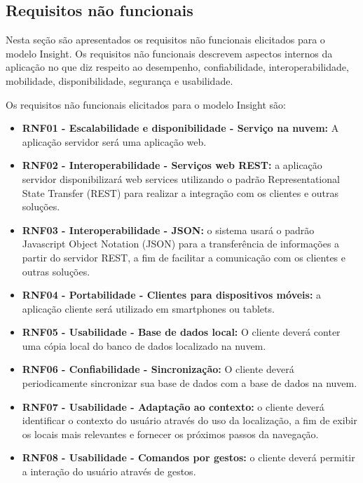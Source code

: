 \documentclass[english,brazilian]{UNISINOSmonografia}
\begin{document}
\subsection{Requisitos não funcionais}
Nesta seção são apresentados os requisitos não funcionais elicitados para o modelo Insight. Os requisitos não funcionais descrevem aspectos internos da aplicação no que diz respeito ao desempenho, confiabilidade, interoperabilidade, mobilidade, disponibilidade, segurança e usabilidade.

Os requisitos não funcionais elicitados para o modelo Insight são:

\begin{itemize}
	\item \textbf{RNF01 - Escalabilidade e disponibilidade - Serviço na nuvem:} A aplicação servidor será uma aplicação web.

	\item \textbf{RNF02 - Interoperabilidade - Serviços web REST:} a aplicação servidor disponibilizará web services utilizando o padrão Representational State Transfer (REST) para realizar a integração com os clientes e outras soluções.

	\item \textbf{RNF03 - Interoperabilidade - JSON:} o sistema usará o padrão Javascript Object Notation (JSON) para a transferência de informações a partir do servidor REST, a fim de facilitar a comunicação com os clientes e outras soluções.

	\item \textbf{RNF04 - Portabilidade - Clientes para dispositivos móveis:} a aplicação cliente será utilizado em smartphones ou tablets.

	\item \textbf{RNF05 - Usabilidade - Base de dados local:} O cliente deverá conter uma cópia local do banco de dados localizado na nuvem.

	\item \textbf{RNF06 - Confiabilidade - Sincronização:} O cliente deverá periodicamente sincronizar sua base de dados com a base de dados na nuvem.

	\item \textbf{RNF07 - Usabilidade - Adaptação ao contexto:} o cliente deverá identificar o contexto do usuário através do uso da localização, a fim de exibir os locais mais relevantes e fornecer os próximos passos da navegação.

	\item \textbf{RNF08 - Usabilidade - Comandos por gestos:} o cliente deverá permitir a interação do usuário através de gestos.


\end{itemize}
\end{document}
